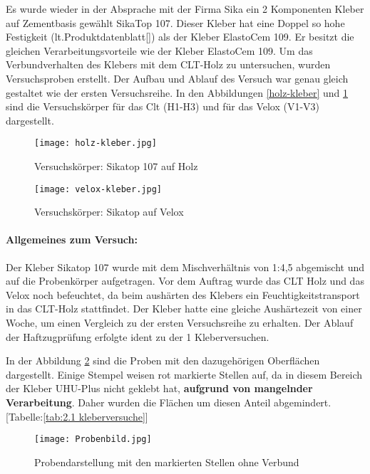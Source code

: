 \documentclass[12 pt,a4 paper ]{scrreprt}
\begin{document}
Es wurde wieder in der Absprache mit der Firma Sika ein  2 Komponenten Kleber auf Zementbasis gewählt SikaTop 107. Dieser Kleber hat  eine Doppel so hohe Festigkeit (lt.Produktdatenblatt[]) als der Kleber ElastoCem 109. Er besitzt die gleichen Verarbeitungsvorteile wie der Kleber ElastoCem 109.
 Um das Verbundverhalten des Klebers mit dem CLT-Holz zu untersuchen, wurden Versuchsproben erstellt. Der Aufbau und Ablauf des Versuch war genau gleich gestaltet wie der ersten Versuchsreihe.
In den Abbildungen \ref{holz-kleber} und \ref{velox-kleber} sind die Versuchskörper für das Clt (H1-H3) und für das Velox (V1-V3) dargestellt.


\begin{figure} 
\begin{minipage}[hbt]{7cm}	
	\texttt{[image: holz-kleber.jpg]}
	\caption{Versuchskörper: Sikatop 107 auf Holz}
	\label{holz-kleber}
\end{minipage}
\hfill
\begin{minipage}[hbt]{7cm}
	\texttt{[image: velox-kleber.jpg]}
	\caption{Versuchskörper: Sikatop auf Velox}
	\label{velox-kleber}
\end{minipage}
\end{figure}

\paragraph{Allgemeines zum Versuch:}
Der Kleber Sikatop 107 wurde mit dem Mischverhältnis von 1:4,5 abgemischt und auf die Probenkörper aufgetragen. Vor dem Auftrag wurde das CLT Holz und das Velox noch befeuchtet, da beim aushärten des Klebers ein Feuchtigkeitstransport in das CLT-Holz stattfindet. Der Kleber hatte eine gleiche Aushärtezeit von einer Woche, um einen Vergleich zu der ersten Versuchsreihe zu erhalten. Der Ablauf der Haftzugprüfung erfolgte ident zu der 1 Kleberversuchen.

In der Abbildung \ref{probenbild} sind die Proben mit den dazugehörigen Oberflächen dargestellt. Einige Stempel weisen rot markierte Stellen auf, da in diesem Bereich der Kleber UHU-Plus nicht geklebt hat, \textbf{aufgrund von mangelnder Verarbeitung}. Daher wurden die Flächen um diesen Anteil abgemindert. [Tabelle:\ref{tab:2.1 kleberversuche}]

\begin{figure}
\begin{center}
\texttt{[image: Probenbild.jpg]}
\caption{Probendarstellung mit den markierten Stellen ohne Verbund}
\label{probenbild}
\end{center}
\end{figure}
\end{document}
